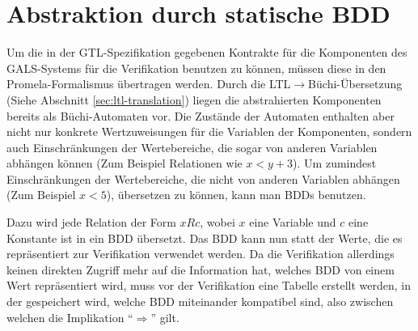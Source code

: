 \section{Abstraktion durch statische BDD}
Um die in der GTL-Spezifikation gegebenen Kontrakte für die Komponenten des GALS-Systems für die Verifikation benutzen zu können, müssen diese in den Promela-Formalismus übertragen werden.
Durch die LTL$\rightarrow$Büchi-Übersetzung (Siehe Abschnitt \ref{sec:ltl-translation}) liegen die abstrahierten Komponenten bereits als Büchi-Automaten vor.
Die Zustände der Automaten enthalten aber nicht nur konkrete Wertzuweisungen für die Variablen der Komponenten, sondern auch Einschränkungen der Wertebereiche, die sogar von anderen Variablen abhängen können (Zum Beispiel Relationen wie $x < y + 3$).
Um zumindest Einschränkungen der Wertebereiche, die nicht von anderen Variablen abhängen (Zum Beispiel $x < 5$), übersetzen zu können, kann man BDDs benutzen.

Dazu wird jede Relation der Form $x R c$, wobei $x$ eine Variable und $c$ eine Konstante ist in ein BDD übersetzt.
Das BDD kann nun statt der Werte, die es repräsentiert zur Verifikation verwendet werden.
Da die Verifikation allerdings keinen direkten Zugriff mehr auf die Information hat, welches BDD von einem Wert repräsentiert wird, muss vor der Verifikation eine Tabelle erstellt werden, in der gespeichert wird, welche BDD miteinander kompatibel sind, also zwischen welchen die Implikation "`$\Rightarrow$"' gilt.